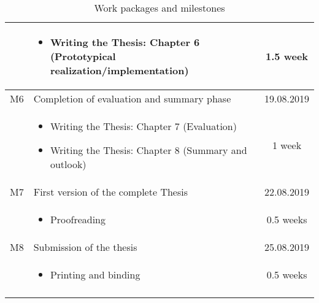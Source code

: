 \begin{flushleft}
\begin{longtable}{ | l | p{11cm} | c |}
		\hline
		& \begin{itemize}
			\item Writing the Thesis: Chapter 6 (Prototypical realization/implementation)
		\end{itemize} & 1.5 week \\
		\hline
		M6 & Completion of evaluation and summary phase & 19.08.2019 \\ 
		\hline
		& \begin{itemize}
			\item Writing the Thesis: Chapter 7 (Evaluation)
			\item Writing the Thesis: Chapter 8 (Summary and outlook)
		\end{itemize} & 1 week \\
		\hline
		M7 & First version of the complete Thesis & 22.08.2019 \\ 
		\hline
		& \begin{itemize}
			\item Proofreading
		\end{itemize} & 0.5 weeks \\
		\hline
		M8 & Submission of the thesis & 25.08.2019 \\ 
		\hline
		& \begin{itemize}
			\item Printing and binding
		\end{itemize} & 0.5 weeks \\
		\hline
		\caption{Work packages and milestones}
		\label{table:timetable}
	\end{longtable}
\end{flushleft}
